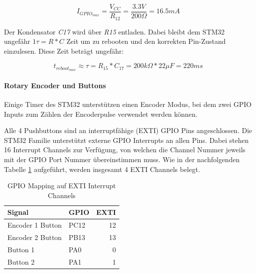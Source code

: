 \begin{equation}
I_{GPIO_{max}}=\frac{V_{CC}}{R_{12}}=\frac{3.3\si{V}}{200\si{\Omega}}=16.5\si{mA}
\end{equation}

Der Kondensator \textit{C17} wird über \textit{R15} entladen. Dabei bleibt dem STM32 ungefähr $1\tau=R*C$ Zeit um zu rebooten und den korrekten Pin-Zustand einzulesen. Diese Zeit beträgt ungefähr:

\begin{equation}
t_{reboot_{max}} \approx \tau = R_{15}*C_{17} = 200\si{k\Omega}*22\si{\mu F}=220\si{ms}
\end{equation}


\paragraph{Rotary Encoder und Buttons}

Einige Timer des STM32 unterstützen einen Encoder Modus, bei dem zwei GPIO Inputs zum Zählen der Encoderpulse verwendet werden können.

Alle 4 Pushbuttons sind an interruptfähige (EXTI) GPIO Pins angeschlossen. 
Die STM32 Familie unterstützt externe GPIO Interrupts an allen Pins. 
Dabei stehen 16 Interrupt Channels zur Verfügung, von welchen die Channel Nummer jeweils mit der GPIO Port Nummer übereinstimmen muss. 
Wie in der nachfolgenden Tabelle \ref{tab:EXTIPins} aufgeführt, werden insgesamt 4 EXTI Channels belegt.

\begin{table}[H]
	\centering
	\begin{tabular}{|l|l|r|}
	\hline
	\textbf{Signal}  & \textbf{GPIO} & \textbf{EXTI} \\ \hline
	Encoder 1 Button & PC12          & 12            \\ \hline
	Encoder 2 Button & PB13          & 13            \\ \hline
	Button 1         & PA0           & 0             \\ \hline
	Button 2         & PA1           & 1             \\ \hline
	\end{tabular}
	\caption{GPIO Mapping auf EXTI Interrupt Channels}
	\label{tab:EXTIPins}
\end{table}




